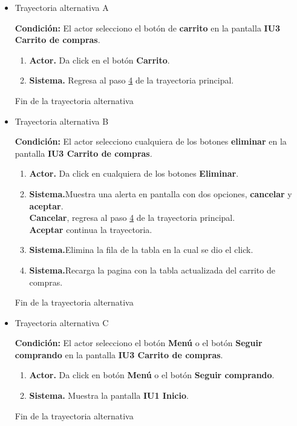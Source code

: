 \begin{itemize}
	
	\item \hypertarget{CU2:TAA}{Trayectoria alternativa A}
	
	\noindent \textbf{Condición:} El actor selecciono el botón de \textbf{carrito} en la pantalla \textbf{IU3 Carrito de compras}.
	
	\begin{enumerate}
		\item \textbf{Actor.} Da click en el botón \textbf{Carrito}.
		\item \textbf{Sistema.} Regresa al paso \hyperlink{CU2:TP:P4}{4} de la trayectoria principal.
	\end{enumerate}
	
	Fin de la trayectoria alternativa
	
	\item \hypertarget{CU2:TAB}{Trayectoria alternativa B}
	
	\noindent \textbf{Condición:} El actor selecciono cualquiera de los botones \textbf{eliminar} en la pantalla \textbf{IU3 Carrito de compras}.
	
	\begin{enumerate}
		\item \textbf{Actor.} Da click en cualquiera de los botones  \textbf{Eliminar}.
		\item \textbf{Sistema.}Muestra una alerta en pantalla con dos opciones, \textbf{cancelar} y \textbf{aceptar}.
		\\ \textbf{Cancelar}, regresa al paso \hyperlink{CU2:TP:P4}{4} de la trayectoria principal.
		\\ \textbf{Aceptar} continua la trayectoria.
		\item \textbf{Sistema.}Elimina la fila de la tabla en la cual se dio el click.
		\item \textbf{Sistema.}Recarga la pagina con la tabla actualizada del carrito de compras.
	\end{enumerate}
	
	Fin de la trayectoria alternativa
	
	\item \hypertarget{CU2:TAC}{Trayectoria alternativa C}
	
	\noindent \textbf{Condición:} El actor selecciono el botón \textbf{Menú} o el botón \textbf{Seguir comprando} en la pantalla \textbf{IU3 Carrito de compras}.
	
	\begin{enumerate}
		\item \textbf{Actor.} Da click en botón \textbf{Menú} o el botón \textbf{Seguir comprando}.
		\item \textbf{Sistema.} Muestra la pantalla \textbf{IU1 Inicio}.
	\end{enumerate}
	
	Fin de la trayectoria alternativa

\end{itemize}

